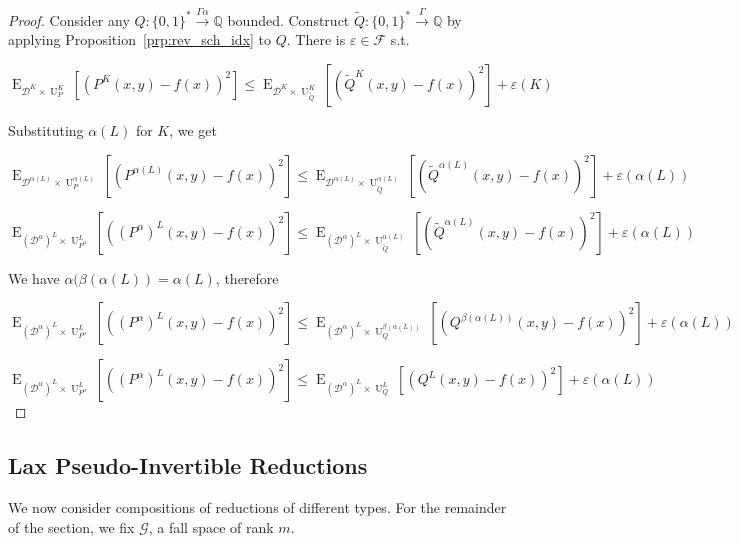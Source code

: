 \documentclass{article}
\numberwithin{equation}{section}
\theoremstyle{definition}
\theoremstyle{plain}
\newcommand{\Bool}{\{0,1\}}
\newcommand{\Words}{{\Bool^*}}
\DeclareMathOperator{\E}{E}
\DeclareMathOperator{\Un}{U}
\newcommand{\Rats}{\mathbb{Q}}
\newcommand{\Dist}{\mathcal{D}}
\newcommand{\Fall}{\mathcal{F}}
\newcommand{\Scheme}{\xrightarrow{\Gamma}}
\begin{document}
\begin{proof}

Consider any ${Q: \Words \xrightarrow{\Gamma \alpha} \Rats}$ bounded. Construct ${\tilde{Q}: \Words \Scheme \Rats}$ by applying Proposition~\ref{prp:rev_sch_idx} to ${Q}$. There is ${\varepsilon \in \Fall}$ s.t.

\[\E_{\Dist^{K} \times \Un_P^K}[(P^K(x,y)-f(x))^2] \leq \E_{\Dist^{K} \times \Un_{\tilde{Q}}^K}[(\tilde{Q}^K(x,y)-f(x))^2] + \varepsilon(K)\]

Substituting ${\alpha(L)}$ for ${K}$, we get

\[\E_{\Dist^{\alpha(L)} \times \Un_P^{\alpha(L)}}[(P^{\alpha(L)}(x,y)-f(x))^2] \leq \E_{\Dist^{\alpha(L)} \times \Un_{\tilde{Q}}^{\alpha(L)}}[(\tilde{Q}^{\alpha(L)}(x,y)-f(x))^2] + \varepsilon({\alpha(L)})\]

\[\E_{(\Dist^\alpha)^{L} \times \Un_{P^\alpha}^L}[((P^\alpha)^L(x,y)-f(x))^2] \leq \E_{(\Dist^\alpha)^{L} \times \Un_{\tilde{Q}}^{\alpha(L)}}[(\tilde{Q}^{\alpha(L)}(x,y)-f(x))^2] + \varepsilon(\alpha(L))\]

We have ${\alpha(\beta(\alpha(L))=\alpha(L)}$, therefore

\[\E_{(\Dist^\alpha)^{L} \times \Un_{P^\alpha}^L}[((P^\alpha)^L(x,y)-f(x))^2] \leq \E_{(\Dist^\alpha)^{L} \times \Un_Q^{\beta(\alpha(L))}}[(Q^{\beta(\alpha(L))}(x,y)-f(x))^2] + \varepsilon(\alpha(L))\]

\[\E_{(\Dist^\alpha)^{L} \times \Un_{P^\alpha}^L}[((P^\alpha)^L(x,y)-f(x))^2] \leq \E_{(\Dist^\alpha)^{L} \times \Un_Q^L}[(Q^L(x,y)-f(x))^2] + \varepsilon(\alpha(L))\]
%
\end{proof}

\subsection{Lax Pseudo-Invertible Reductions}

We now consider compositions of reductions of different types. For the remainder of the section, we fix ${\mathcal{G}}$, a fall space of rank ${m}$. 
\end{document}
